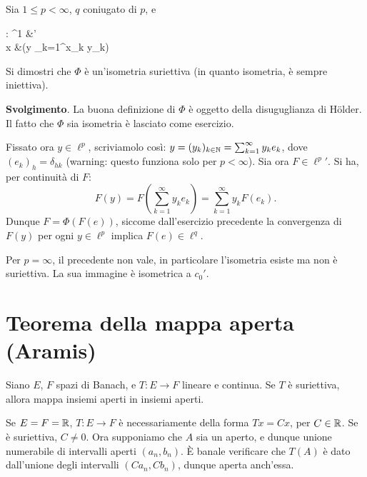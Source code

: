 \begin{exercise}
	Sia $1 \leq p < \infty$, $q$ coniugato di $p$, e
	\begin{eqalign*}
		\Phi : \ell^1 &'\\
			x &\longmapsto (y \mapsto \sum_{k=1}^\infty x_k y_k)
	\end{eqalign*}
	Si dimostri che $\Phi$ è un'isometria suriettiva (in quanto isometria, è sempre iniettiva).

	\textbf{Svolgimento}. La buona definizione di $\Phi$ è oggetto della disuguglianza di H\"older. Il fatto che $\Phi$ sia isometria è lasciato come esercizio.

	Fissato ora $y \in \ell^p$, scriviamolo così: $y=(y_k)_{k \in \mathbb{N}} = \sum_{k=1}^\infty y_k e_k$, dove $(e_k)_h = \delta_{hk}$ (warning: questo funziona solo per $p < \infty$). Sia ora $F \in {\ell^p}'$. Si ha, per continuità di $F$:
	\begin{equation*}
		F(y) = F(\sum_{k=1}^\infty y_k e_k) = \sum_{k=1}^\infty y_k F(e_k).
	\end{equation*}
	Dunque $F = \Phi(F(e))$, siccome dall'esercizio precedente la convergenza di $F(y)$ per ogni $y \in \ell^p$ implica $F(e) \in \ell^q$.
\end{exercise}

\begin{remark}
	Per $p=\infty$, il precedente non vale, in particolare l'isometria esiste ma non è suriettiva. La sua immagine è isometrica a $c_0'$.
\end{remark}

\section{Teorema della mappa aperta (Aramis)}
\begin{theorem}
	Siano $E$, $F$ spazi di Banach, e $T : E \to F$ lineare e continua. Se $T$ è suriettiva, allora mappa insiemi aperti in insiemi aperti.
\end{theorem}

\begin{example}
	Se $E = F = \mathbb{R}$, $T : E \to F$ è necessariamente della forma $Tx = Cx$, per $C \in \mathbb{R}$. Se è suriettiva, $C \neq 0$. Ora supponiamo che $A$ sia un aperto, e dunque unione numerabile di intervalli aperti $(a_n, b_n)$. È banale verificare che $T(A)$ è dato dall'unione degli intervalli $(Ca_n, Cb_n)$, dunque aperta anch'essa.
\end{example}


